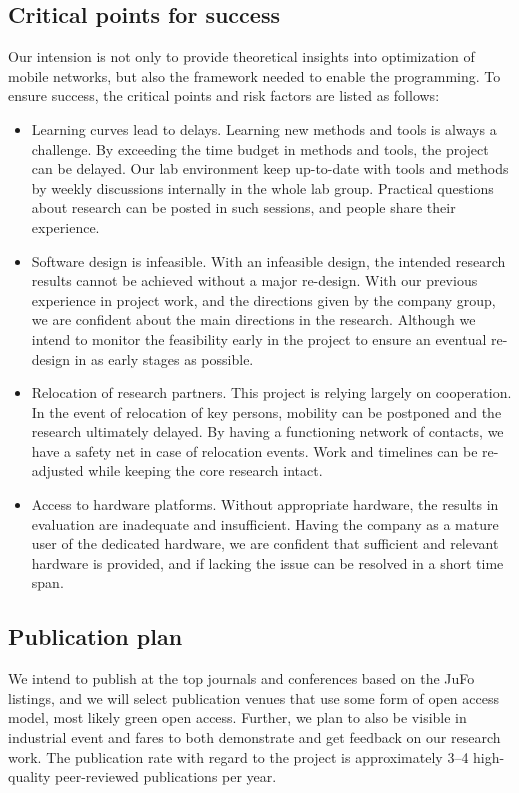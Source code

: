 \documentclass{article}
\begin{document}
\subsection{Critical points for success}
Our intension is not only to provide theoretical insights into optimization of mobile networks, but also the framework needed
to enable the programming. 
To ensure success, the critical points and risk factors are listed as follows:
\begin{itemize}
\item Learning curves lead to delays. Learning new methods and tools is always a challenge. By exceeding the time
budget in methods and tools, the project can be delayed. Our lab environment keep up-to-date with tools
and methods by weekly discussions internally in the whole lab group. Practical questions about research can
be posted in such sessions, and people share their experience.\vspace{-0.2cm}
\item Software design is infeasible. With an infeasible design, the intended research results cannot be achieved
without a major re-design. With our previous experience in project work, and the directions given by the company group,
we are confident about the main directions in the research. Although we intend to monitor the feasibility
early in the project to ensure an eventual re-design in as early stages as possible.\vspace{-0.2cm}
\item Relocation of research partners. This project is relying largely on cooperation. In the event of relocation
of key persons, mobility can be postponed and the research ultimately delayed. By having a functioning network
of contacts, we have a safety net in case of relocation events. Work and timelines can be re-adjusted while
keeping the core research intact.\vspace{-0.2cm}
\item Access to hardware platforms. Without appropriate hardware, the results in evaluation are inadequate and
insufficient. Having the company as a mature user of the dedicated hardware, we are confident that sufficient and relevant hardware is provided, and if lacking the issue can be resolved in a short time span.
\end{itemize}
\subsection{Publication plan}
We intend to publish at the top journals and conferences based on the JuFo listings, and we will select publication venues that use some form of open access model, most likely green open access. 
Further, we plan to also be visible in industrial event and fares to both demonstrate and get feedback on our research work. 
The publication rate with regard to the project is approximately 3--4 high-quality peer-reviewed publications per year.
\end{document}
